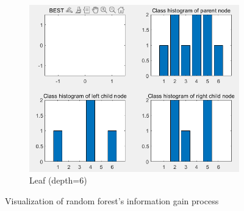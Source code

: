 \begin{figure}
\begin{subfigure}{0.33\linewidth}
		\includegraphics[width=\linewidth]{image/q5-app/hist6.png}
		\caption{Leaf (depth=6)}
	\end{subfigure}
	\caption{Visualization of random forest's information gain process}
	\label{fig:app-q5-1}
\end{figure}